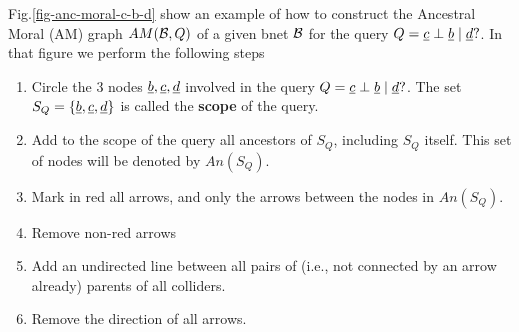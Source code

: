 Fig.\ref{fig-anc-moral-c-b-d}
show an example of how to construct the Ancestral Moral (AM) graph
$AM({\cal B}, Q)$
of a given bnet ${\cal B}$ for the query
$Q=\rvc\perp \rvb\mid \rvd?$.
In that figure
we perform the following steps

\begin{enumerate}
\item Circle the 3 nodes
$\rvb, \rvc, \rvd$  involved
in the query $Q=\rvc\perp \rvb\mid \rvd?$.
The set $S_Q=\{\rvb, \rvc, \rvd\}$
is called the {\bf scope} of the query.

\item Add to the scope of the  query
all ancestors of $S_Q$, including $S_Q$ itself.
This set of nodes will be denoted by $An(S_Q)$.

\item Mark in red all arrows, and only the arrows between the
nodes in $An(S_Q)$.

\item Remove non-red arrows

\item Add an undirected line between all
pairs of  (i.e., not connected by an arrow already) parents of all colliders.

\item Remove the direction of all arrows.

\end{enumerate}

